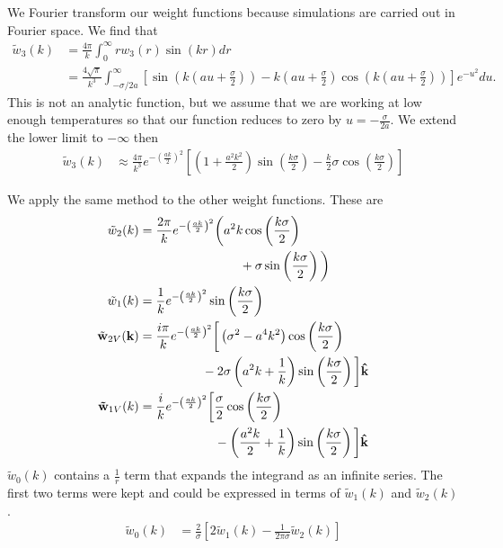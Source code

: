 \documentclass[letterpaper,twocolumn,amsmath,amssymb,prb]{revtex4-1}
\newcommand{\kk}{\textbf{k}}
\begin{document}
We Fourier transform our weight functions because simulations are
carried out in Fourier space.  We find that
\begin{align}
  \tilde{w}_3(k) &= \frac{4\pi}{k} \int_0^\infty r w_3(r) \sin(kr) dr \\ 
  &= \frac{4\sqrt{\pi}}{k^3}\int_{-\sigma/2a}^\infty \left[
    \sin(k(au+\frac{\sigma}{2})) - k(au + \frac{\sigma}{2})
    \cos(k(au+\frac{\sigma}{2}))\right] e^{-u^2} du.
\end{align}
This is not an analytic function, but we assume that we are working at
low enough temperatures so that our function reduces to zero by $u=
-\frac{\sigma}{2a}$. We extend the lower limit to $-\infty$ then
\begin{align}
  \tilde{w}_3(k) &\approx
  \frac{4\pi}{k^3}e^{-\left(\frac{ak}{2}\right)^2}\left[ \left(1 +
    \frac{a^2k^2}{2} \right) \sin\left(\frac{k\sigma}{2}\right) -
    \frac{k}{2} \sigma\cos\left(\frac{k \sigma}{2}\right) \right]
\end{align}

We apply the same method to the other weight functions. These are
\begin{align}
  \tilde{w}_2(k) &=\frac{2\pi}{k} e^{-\left(\frac{ak}{2} \right)^2}
  \bigg(a^2 k \cos\left(\frac{k\sigma}{2}\right) \notag \\
  & \hspace{8em}+\sigma \sin\left(\frac{k\sigma}{2}\right) \bigg) \\ 
  \tilde{w}_1(k) &=
  \frac{1}{k}e^{-\left(\frac{ak}{2} \right)^2}
  \sin\left(\frac{k\sigma}{2}\right) \\
  \tilde{\mathbf{w}}_{2V}(\kk) &=
  \frac{i \pi}{k} e^{-\left(\frac{ak}{2} \right)^2}\bigg[ \left(\sigma^2 - a^4k^2\right)
    \cos\left(\frac{k\sigma}{2}\right) \notag\\ 
    & \hspace{5em}- 2\sigma \left(a^2k + \frac{1}{k}
    \right)\sin\left(\frac{k\sigma}{2}\right) \bigg]
  \mathbf{\hat{k}} \\ 
  \mathbf{\tilde{w}}_{1V}(k)&= \frac{i}{k}
   e^{-\left(\frac{ak}{2} \right)^2} \bigg[ \frac{\sigma}{2}
    \cos\left(\frac{k\sigma}{2}\right) \notag\\
    & \hspace{6em}- \left( \frac{a^2k}{2} +
    \frac{1}{k} \right) \sin\left(\frac{k\sigma}{2}\right) \bigg]
  \mathbf{\hat{k}}
\end{align}
$\tilde{w}_0(k)$ contains a $\frac{1}{r}$ term that expands the
integrand  as an infinite series. The first two terms were kept and
could be expressed in terms of $\tilde{w}_1(k)$ and
$\tilde{w}_2(k)$.
\begin{align}
  \tilde{w}_0(k) &= \frac{2}{\sigma} \left[2\tilde{w}_1(k) - \frac{1}{2 \pi
      \sigma}\tilde{w}_2(k) \right]
\end{align}
 
\end{document}
